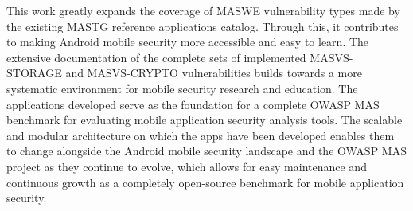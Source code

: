 This work greatly expands the coverage of MASWE vulnerability types made by the existing MASTG reference applications catalog. Through this, it contributes to making Android mobile security more accessible and easy to learn. The extensive documentation of the complete sets of implemented MASVS-STORAGE and MASVS-CRYPTO vulnerabilities builds towards a more systematic environment for mobile security research and education. The applications developed serve as the foundation for a complete OWASP MAS benchmark for evaluating mobile application security analysis tools. The scalable and modular architecture on which the apps have been developed enables them to change alongside the Android mobile security landscape and the OWASP MAS project as they continue to evolve, which allows for easy maintenance and continuous growth as a completely open-source benchmark for mobile application security.